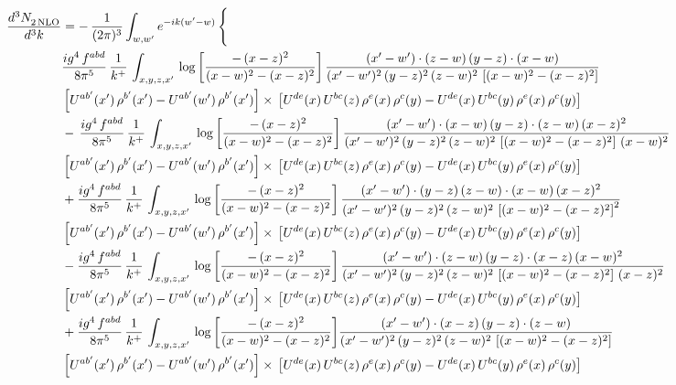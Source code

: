 \documentclass[9pt]{article}
\numberwithin{equation}{section}
\begin{document}
\begin{align}
   \frac{d^{3}N_{2\,\rm NLO}^{\rm}}{d^{3}k}  & =  -\,\frac{1}{(2\pi)^{3}}  \int_{w, w^\prime} e^{-ik(w^\prime-w)}\, \Bigg\{\notag \\ &  \frac{ig^{4}\, f^{abd}}{8\pi^{5}}\, \frac{1}{k^{+}}\, \int_{x,y,z,x'}\,\log{\left[\frac{-\,(x-z)^{2}}{(x-w)^{2}-(x-z)^{2}}\right]}\,\frac{(x'-w')\cdot (z-w)\, (y-z)\cdot (x-w)}{(x'-w')^{2}\, (y-z)^{2}\, (z-w)^{2}\,\left[(x-w)^{2}-(x-z)^{2}\right]}\, \notag \\ & \left[U^{ab'}(x')\,\rho^{b'}(x')-U^{ab'}(w')\, \rho^{b'}(x')\right]\times\,\left[U^{de}(x)\,U^{bc}(z)\, \rho^{e}(x)\,\rho^{c}(y)-U^{de}(x)\,U^{bc}(y)\,\rho^{e}(x)\,\rho^{c}(y)\right] \notag \\
& -\,\frac{ig^{4}\, f^{abd}}{8\pi^{5}}\, \frac{1}{k^{+}}\, \int_{x,y,z,x'}\,\log{\left[\frac{-\,(x-z)^{2}}{(x-w)^{2}-(x-z)^{2}}\right]}\,\frac{(x'-w')\cdot (x-w)\, (y-z)\cdot(z-w)\,(x-z)^{2}}{(x'-w')^{2}\, (y-z)^{2}\, (z-w)^{2}\,\left[(x-w)^{2}-(x-z)^{2}\right]\,(x-w)^{2}}\, \notag \\ & \left[U^{ab'}(x')\,\rho^{b'}(x')-U^{ab'}(w')\, \rho^{b'}(x')\right]\times\,\left[U^{de}(x)\,U^{bc}(z)\, \rho^{e}(x)\,\rho^{c}(y)-U^{de}(x)\,U^{bc}(y)\,\rho^{e}(x)\,\rho^{c}(y)\right] \notag \\
& +\frac{ig^{4}\, f^{abd}}{8\pi^{5}}\, \frac{1}{k^{+}}\, \int_{x,y,z,x'}\,\log{\left[\frac{-\,(x-z)^{2}}{(x-w)^{2}-(x-z)^{2}}\right]}\,\frac{(x'-w')\cdot  (y-z)\, (z-w)\cdot (x-w)\, (x-z)^{2}}{(x'-w')^{2}\, (y-z)^{2}\, (z-w)^{2}\,\left[(x-w)^{2}-(x-z)^{2}\right]^{2}}\, \notag \\ & \left[U^{ab'}(x')\,\rho^{b'}(x')-U^{ab'}(w')\, \rho^{b'}(x')\right]\times\,\left[U^{de}(x)\,U^{bc}(z)\, \rho^{e}(x)\,\rho^{c}(y)-U^{de}(x)\,U^{bc}(y)\,\rho^{e}(x)\,\rho^{c}(y)\right] \notag \\
& - \frac{ig^{4}\, f^{abd}}{8\pi^{5}}\, \frac{1}{k^{+}}\, \int_{x,y,z,x'}\,\log{\left[\frac{-\,(x-z)^{2}}{(x-w)^{2}-(x-z)^{2}}\right]}\,\frac{(x'-w')\cdot (z-w)\, (y-z)\cdot (x-z)\, (x-w)^{2}}{(x'-w')^{2}\, (y-z)^{2}\, (z-w)^{2}\,\left[(x-w)^{2} - (x-z)^{2}\right]\, (x-z)^{2}}\, \notag \\ & \left[U^{ab'}(x')\,\rho^{b'}(x')-U^{ab'}(w')\, \rho^{b'}(x')\right]\times\,\left[U^{de}(x)\,U^{bc}(z)\, \rho^{e}(x)\,\rho^{c}(y)-U^{de}(x)\,U^{bc}(y)\,\rho^{e}(x)\,\rho^{c}(y)\right] \notag \\
& +\frac{ig^{4}\, f^{abd}}{8\pi^{5}}\, \frac{1}{k^{+}}\, \int_{x,y,z,x'}\,\log{\left[\frac{-\,(x-z)^{2}}{(x-w)^{2}-(x-z)^{2}}\right]}\frac{(x'-w')\cdot (x-z)\, (y-z)\cdot (z-w)}{(x'-w')^{2}\, (y-z)^{2}\, (z-w)^{2}\,\left[(x-w)^{2} -(x-z)^{2}\right]}\, \notag \\ & \left[U^{ab'}(x')\,\rho^{b'}(x')-U^{ab'}(w')\, \rho^{b'}(x')\right]\times\,\left[U^{de}(x)\,U^{bc}(z)\, \rho^{e}(x)\,\rho^{c}(y)-U^{de}(x)\,U^{bc}(y)\,\rho^{e}(x)\,\rho^{c}(y)\right] \notag \\

\end{align}
\end{document}
